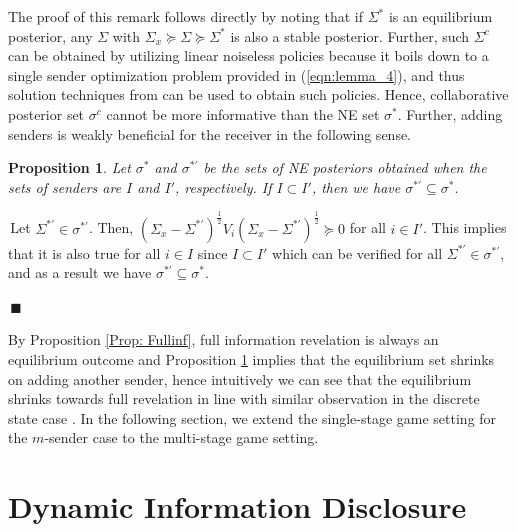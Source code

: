 \documentclass[12pt,journal,onecolumn]{IEEEtran}
\newtheorem{prop}{{Proposition}}
\newenvironment{Proof}[1]{\medskip\par\noindent{\bf Proof:\,}\,#1}{{\mbox{\,$\blacksquare$}\par}}
\begin{document}
The proof of this remark follows directly by noting that if $\Sigma^*$ is an equilibrium posterior, any $\Sigma$ with $\Sigma_x\succeq\Sigma\succeq\Sigma^*$ is also a stable posterior. Further, such $\Sigma^c$ can be obtained by utilizing linear noiseless policies because it boils down to a single sender optimization problem provided in (\ref{eqn:lemma_4}), and thus solution techniques from \cite{tamura2018bayesian} can be used to obtain such policies. Hence, collaborative posterior set $\sigma^c$ cannot be more informative than the NE set $\sigma^*$. Further, adding senders is weakly beneficial for the receiver in the following sense.
\begin{prop}\label{Prop: eqshrink}
    Let $\sigma^*$ and $\sigma^{*'}$ be the sets of NE posteriors obtained when the sets of senders are $I$ and $I'$, respectively. If $I\subset I'$, then we have $\sigma^{*'}\subseteq \sigma^*$. 
\end{prop}
\begin{Proof}
    Let $\Sigma^{*'}\in\sigma^{*'}$. Then, $(\Sigma_x-\Sigma^{*'})^{\frac{1}{2}}V_i(\Sigma_x-\Sigma^{*'})^{\frac{1}{2}}\succeq0$ for all $i\in I'$. This implies that it is also true for all $i\in I$ since $I\subset I'$ which can be verified for all $\Sigma^{*'}\in\sigma^{*'}$, and as a result we have $\sigma^{*'}\subseteq \sigma^*$. 
\end{Proof}
By Proposition \ref{Prop: Fullinf}, full information revelation is always an equilibrium outcome and Proposition \ref{Prop: eqshrink} implies that the equilibrium set shrinks on adding another sender, hence intuitively we can see that the equilibrium shrinks towards full revelation in line with similar observation in the discrete state case \cite{gentzkow2017bayesian}. In the following section, we extend the single-stage game setting for the $m$-sender case to the multi-stage game setting. 

\section{Dynamic Information Disclosure}\label{Sect:Dynamic}
\end{document}
